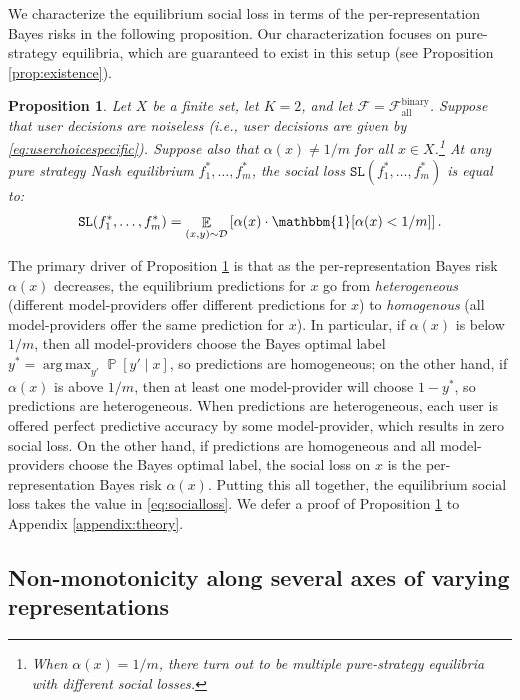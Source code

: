 \documentclass[letterpaper,11pt]{article}
\newtheorem{proposition}{Proposition}
\theoremstyle{plain}
\DeclareMathOperator*{\argmax}{arg\,max}
\DeclareMathOperator*{\E}{\mathbb{E}}
\DeclareMathOperator*{\Prob}{\mathbb{P}}
\begin{document}
We characterize the equilibrium social loss in terms of the per-representation Bayes risks in the following proposition. Our characterization focuses on  pure-strategy equilibria, which are guaranteed to exist in this setup (see Proposition \ref{prop:existence}).
\begin{proposition}
\label{prop:idealized}
Let $X$ be a finite set, let $K =2$, and let $\mathcal{F} = \mathcal{F}^{\text{binary}}_{\text{all}}$. Suppose that user decisions are noiseless (i.e., user decisions are given by \eqref{eq:userchoicespecific}). 
Suppose also that $\alpha(x) \neq 1/m$ for all $x \in X$.\footnote{When $\alpha(x) = 1/m$, there turn out to be multiple pure-strategy equilibria with different social losses.} 
At any pure strategy Nash equilibrium $f^*_1, \ldots, f^*_m$, the social loss $\texttt{SL}(f^*_1, \ldots, f^*_m)$ is equal to:
\begin{equation}
\label{eq:socialloss} 
\texttt{SL}(f^*_1, \ldots, f^*_m) =  \E_{(x,y) \sim \mathcal{D}} \left[\alpha(x) \cdot \mathbbm{1}[\alpha(x) < 1/m] \right]. 
\end{equation}
\end{proposition}
\noindent The primary driver of Proposition \ref{prop:idealized} 
is that as the per-representation Bayes risk $\alpha(x)$ decreases, the equilibrium predictions for $x$ go from \textit{heterogeneous} (different model-providers offer different predictions for $x$) to \textit{homogenous} (all model-providers offer the same prediction for $x$). In particular, if $\alpha(x)$ is below $1/m$, then all model-providers choose the Bayes optimal label $y^* = \argmax_{y'} \Prob[y' \mid x]$, so predictions are homogeneous; on the other hand, if $\alpha(x)$ is above $1/m$, then at least one model-provider will choose $1- y^*$, so predictions are heterogeneous. 
When predictions are heterogeneous, each user is offered perfect predictive accuracy by some model-provider, which results in zero social loss. On the other hand, if predictions are homogeneous and all model-providers choose the Bayes optimal label, the social loss on $x$ is the per-representation Bayes risk $\alpha(x)$. Putting this all together, the equilibrium social loss takes the value in \eqref{eq:socialloss}. We defer a proof of Proposition \ref{prop:idealized} to Appendix \ref{appendix:theory}.

\subsection{Non-monotonicity along several axes of varying representations}\label{subsec:examples}
\end{document}
